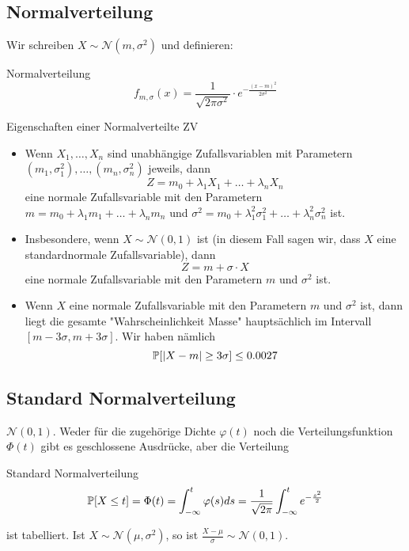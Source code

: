 \subsection*{Normalverteilung} Wir schreiben $X \sim \mathcal{N}(m, \sigma^2)$ und definieren:
\begin{mainbox}{Normalverteilung}
    $$f_{m, \sigma}(x) = \frac{1}{\sqrt{2 \pi \sigma^2}} \cdot e^{-\frac{(x-m)^2}{2 \sigma^2}}$$
\end{mainbox}

\begin{subbox}{Eigenschaften einer Normalverteilte ZV}
    \begin{itemize}
        \item Wenn $X_1, \ldots , X_n$ sind unabhängige Zufallsvariablen mit Parametern $(m_1, \sigma^2_1), \ldots, (m_n, \sigma^2_n)$
        jeweils, dann
        $$Z = m_0 + \lambda_1X_1 + \ldots + \lambda_nX_n$$
        eine normale Zufallsvariable mit den Parametern $m = m_0 + \lambda_1m_1 + \ldots + \lambda_nm_n$ und $\sigma^2 = m_0 + \lambda^2_1\sigma^2_1 + \ldots + \lambda^2_n\sigma^2_n$ ist.
        \item Insbesondere, wenn $X \sim \mathcal{N}(0, 1)$ ist (in diesem Fall sagen wir, dass $X$ eine standardnormale
        Zufallsvariable), dann $$Z = m + \sigma \cdot X$$
        eine normale Zufallsvariable mit den Parametern $m$ und $\sigma^2$ ist.
        \item Wenn $X$ eine normale Zufallsvariable mit den Parametern $m$ und $\sigma^2$ ist, dann liegt die gesamte "Wahrscheinlichkeit
        Masse" hauptsächlich im Intervall $[m - 3\sigma, m + 3\sigma]$. Wir haben nämlich
        $$\mathbb{P}[ |X - m| \geq 3\sigma] \leq 0.0027$$
    \end{itemize}
\end{subbox}


\subsection*{Standard Normalverteilung} $\mathcal{N}(0,1)$. Weder für die zugehörige Dichte $\varphi(t)$ noch die Verteilungsfunktion $\Phi(t)$ gibt es geschlossene Ausdrücke, aber die Verteilung
\begin{mainbox}{Standard Normalverteilung}
    $$\mathbb{P}[X \leq t] = \Phi(t) = \int_{-\infty}^t \varphi(s)ds = \frac{1}{\sqrt{2 \pi}} \int_{-\infty}^t e^{-\frac{s^2}{2}}$$
\end{mainbox}


ist tabelliert. Ist $X \sim \mathcal{N}(\mu,\sigma^2)$, so ist $\frac{X - \mu}{\sigma} \sim \mathcal{N}(0,1)$.

\columnbreak